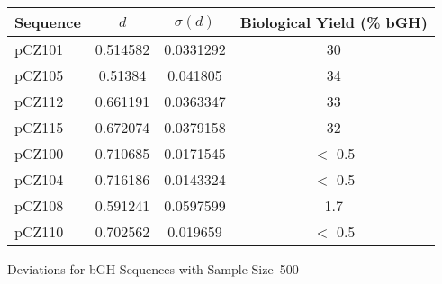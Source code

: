 \begin{cfigure}
\begin{singlespace}
\begin{small}
    \begin{tabular}{lccc}
        \toprule
        \textbf{Sequence} & $d$ & $\sigma(d)$ & Biological Yield (\% bGH)\\
        \midrule
        pCZ101 & 0.514582 & 0.0331292 & 30 \\
        pCZ105 & 0.51384 & 0.041805 & 34\\
        pCZ112 & 0.661191 & 0.0363347 & 33\\
        pCZ115 & 0.672074 & 0.0379158 & 32\\
        \midrule
        pCZ100 & 0.710685 & 0.0171545 & $<$ 0.5\\
        pCZ104 & 0.716186 & 0.0143324 & $<$ 0.5\\
        pCZ108 & 0.591241 & 0.0597599 & 1.7\\
        pCZ110 & 0.702562 & 0.019659 & $<$ 0.5\\
        \bottomrule
    \end{tabular}
    \caption{Deviations for bGH Sequences with Sample Size~500}
    \label{bgh:deviation}
\end{small}
\end{singlespace}
\end{cfigure}
